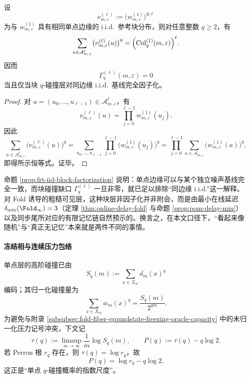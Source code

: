 \begin{proposition}\label{prop:frt-iid-block-factorization}
设
\[
\nu^{(\ell)}_{m,\varepsilon}
:=
\bigl(w^{(1)}_{m,\varepsilon}\bigr)^{\otimes \ell}
\]
为与 \(w^{(1)}_{m,\varepsilon}\) 具有相同单点边缘的 i.i.d.\ 参考块分布，则对任意整数 \(q\ge 2\)，有
\[
\sum_{u\in \mathcal A_{m,\varepsilon}^{\ell}}
\bigl(\nu^{(\ell)}_{m,\varepsilon}(u)\bigr)^q
=
\Bigl(\mathrm{Col}^{(1)}_q(m,\varepsilon)\Bigr)^\ell.
\]
因而
\[
\Gamma^{(\ell)}_q(m,\varepsilon)=0
\]
当且仅当块 \(q\)-碰撞层对同边缘 i.i.d.\ 基线完全因子化。
\end{proposition}
\begin{proof}
对 \(u=(u_0,\dots,u_{\ell-1})\in \mathcal A_{m,\varepsilon}^{\ell}\)，有
\[
\nu^{(\ell)}_{m,\varepsilon}(u)
=
\prod_{j=0}^{\ell-1} w^{(1)}_{m,\varepsilon}(u_j).
\]
因此
\[
\sum_{u\in \mathcal A_{m,\varepsilon}^{\ell}}
\bigl(\nu^{(\ell)}_{m,\varepsilon}(u)\bigr)^q
=
\sum_{u_0,\dots,u_{\ell-1}}
\prod_{j=0}^{\ell-1}\bigl(w^{(1)}_{m,\varepsilon}(u_j)\bigr)^q
=
\prod_{j=0}^{\ell-1}
\sum_{a\in \mathcal A_{m,\varepsilon}}
\bigl(w^{(1)}_{m,\varepsilon}(a)\bigr)^q,
\]
即得所示恒等式。证毕。
\end{proof}

\begin{remark}[表观随机的最小判别]\label{rem:frt-block-collision-gap-meaning}
命题 \ref{prop:frt-iid-block-factorization} 说明：单点边缘可以与某个独立噪声基线完全一致，而块碰撞缺口 \(\Gamma_q^{(\ell)}\) 一旦非零，就已足以排除“同边缘 i.i.d.”这一解释。对 Fold 诱导的粗糙可见层，这种块层非因子化并非附会，而是由最小在线延迟 \(\delta_{\min}(\Fold_\infty)=3\)（定理 \ref{thm:online-delay-fold} 与命题 \ref{prop:pom-delay-min}）以及同步尾所对应的有限记忆链自然预示的。换言之，在本文口径下，“看起来像随机”与“真正无记忆”本来就是两件不同的事情。
\end{remark}

\paragraph{冻结相与连续压力包络}
单点层的高阶碰撞已由
\[
S_q(m):=\sum_{x\in X_m}d_m(x)^q
\]
编码；其归一化碰撞量为
\[
\sum_{x\in X_m} w_m(x)^q
=
\frac{S_q(m)}{2^{qm}}.
\]
为避免与附录 \ref{subsubsec:fold-fiber-groundstate-freezing-oracle-capacity} 中的未归一化压力记号冲突，下文记
\[
\tau(q):=\limsup_{m\to\infty}\frac{1}{m}\log S_q(m),
\qquad
P(q):=\tau(q)-q\log 2.
\]
若 Perron 根 \(r_q\) 存在，则 \(\tau(q)=\log r_q\)，故
\[
P(q)=\log r_q-q\log 2.
\]
这正是“单点 \(q\)-碰撞概率的指数尺度”。


